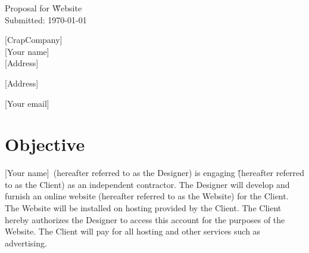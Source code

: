 \documentclass[a4paper,12pt]{article} %
\newcommand{\EmployeeName}{[Your name]}
\newcommand{\CompanyName}{[CrapCompany]}
\newcommand{\AddressLineOne}{[Address]}
\newcommand{\AddressLineTwo}{[Address]}
\newcommand{\EmployeeEmail}{[Your email]}
\begin{document}

\begin{titlepage}

\vspace*{\fill} %

\begin{center}

{\LARGE Proposal for \~Website}\\ [1.5cm]

Submitted: \today

\end{center}

\CompanyName\\

\EmployeeName\\

\AddressLineOne

\AddressLineTwo

\EmployeeEmail

\vspace*{\fill} %

\end{titlepage}


\section{Objective}

\EmployeeName~(hereafter referred to as the Designer) is engaging \~(hereafter referred to as the Client) as an independent contractor. The Designer will develop and furnish an online website (hereafter referred to as the Website) for the Client. The Website will be installed on hosting provided by the Client. The Client hereby authorizes the Designer to access this account for the purposes of the Website. The Client will pay for all hosting and other services such as advertising.

\end{document}
